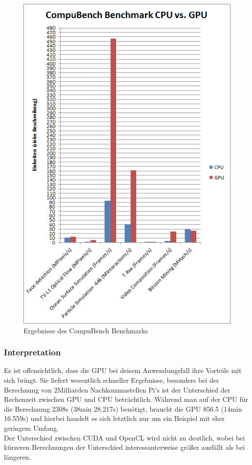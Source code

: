 \begin{figure}[!h]
	\begin{center}
		\includegraphics[width=0.8\linewidth]{images/CompuBench.png}
		\caption{Ergebnisse des CompuBench Benchmarks}
		\label{CompuBench}
	\end{center}
\end{figure}
\pagebreak
\subsubsection{Interpretation}
Es ist offensichtlich, dass die GPU bei deisem Anwendungsfall ihre Vorteile mit sich bringt. Sie liefert wesentlich schneller Ergebnisse, besonders bei der Berechnung von 2Milliarden Nachkommastellen Pi's ist der Unterschied der Rechenzeit zwischen GPU und CPU beträchtlich. Während man auf der CPU für die Berechnung 2308s (38min 28.217s) benötigt, braucht die GPU 856.5 (14min 16.559s) und hierbei handelt es sich letztlich nur um ein Beispiel mit eher geringem Umfang.\\
Der Unterschied zwischen CUDA und OpenCL wird nicht zu deutlich, wobei bei kürzeren Berechnungen der Unterschied interessanterweise größer ausfällt als bei längeren.
